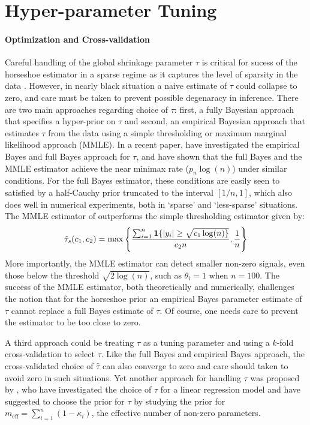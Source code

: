 \documentclass[11pt]{article}
\numberwithin{equation}{section}
\begin{document}
\section{Hyper-parameter Tuning}

\paragraph{Optimization and Cross-validation}

Careful handling of the global shrinkage parameter $\tau$ is critical for sucess of the horseshoe estimator in a sparse regime as it captures the level of sparsity in the data \citep{carvalho2010horseshoe, datta2013asymptotic, van2015conditions, van2016many}. However, in nearly black situation a naive estimate of $\tau$ could collapse to zero, and care must be taken to prevent possible degenaracy in inference. There are two main approaches regarding choice of $\tau$: first, a fully Bayesian approach that specifies a hyper-prior on $\tau$ and second, an empirical Bayesian approach that estimates $\tau$ from the data using a simple thresholding or maximum marginal likelihood approach (MMLE). In a recent paper, \citet{van2017adaptive} have investigated the empirical Bayes and full Bayes approach for $\tau$, and have shown that the full Bayes and the MMLE estimator achieve the near minimax rate ($p_n \log(n)$) under similar conditions. For the full Bayes estimator, these conditions are easily seen to satisfied by a half-Cauchy prior truncated to the interval $[1/n,1]$, which also does well in numerical experiments, both in `sparse' and `less-sparse' situations. The MMLE estimator of \citet{van2017adaptive} outperforms the simple thresholding estimator given by:
\[
\hat{\tau}_s(c_1, c_2) = \max \left \{ \frac{\sum_{i=1}^{n} {\bf 1} \{ \lvert y_i\rvert \ge \sqrt{c_1 \log(n) \}}}{c_2 n}, \frac{1}{n} \right\}
\]
More importantly, the MMLE estimator can detect smaller non-zero signals, even those below the threshold $\sqrt{2 \log(n)}$, such as $\theta_i = 1$ when $n = 100$. 
The success of the MMLE estimator, both theoretically and numerically, challenges the notion that for the horseshoe prior an empirical Bayes parameter estimate of $\tau$ cannot replace a full Bayes estimate of $\tau$. Of course, one needs care to prevent the estimator to be too close to zero. 

A third approach could be treating $\tau$ as a tuning parameter and using a $k$-fold cross-validation to select $\tau$. Like the full Bayes and empirical Bayes approach, the cross-validated choice of $\hat{\tau}$ can also converge to zero and care should taken to avoid zero in such situations. Yet another approach for handling $\tau$ was proposed by \citet{piironen2016hyperprior}, who have investigated the choice of $\tau$ for a linear regression model and have suggested to choose the prior for $\tau$ by studying the prior for $m_{\text{eff}} = \sum_{i=1}^{n} (1-\kappa_i)$, the effective number of non-zero parameters. 
\end{document}
